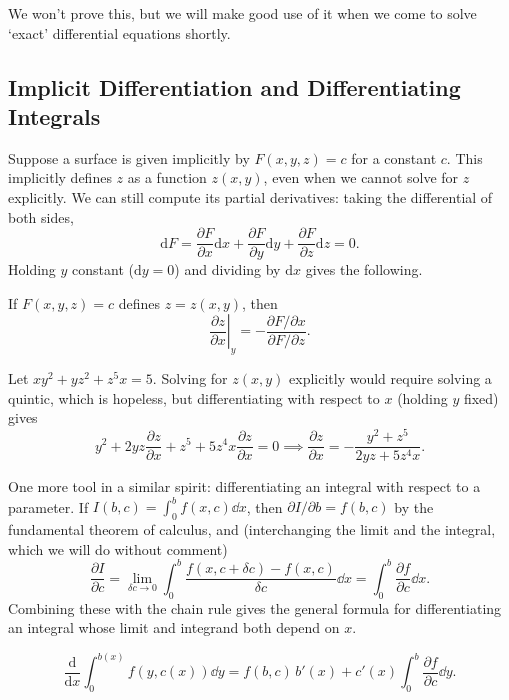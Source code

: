We won't prove this, but we will make good use of it when we come to solve `exact' differential equations shortly.

\subsection{Implicit Differentiation and Differentiating Integrals}

Suppose a surface is given implicitly by $F(x, y, z) = c$ for a constant $c$. This implicitly defines $z$ as a function $z(x, y)$, even when we cannot solve for $z$ explicitly. We can still compute its partial derivatives: taking the differential of both sides,
$$
\mathrm{d}F = \frac{\partial F}{\partial x} \mathrm{d}x + \frac{\partial F}{\partial y}\mathrm{d}y + \frac{\partial F}{\partial z}\mathrm{d}z = 0.
$$
Holding $y$ constant ($\mathrm{d}y = 0$) and dividing by $\mathrm{d}x$ gives the following.

\begin{proposition}
	If $F(x, y, z) = c$ defines $z = z(x, y)$, then
	$$
	\left.\frac{\partial z}{\partial x}\right|_y = -\frac{\partial F/\partial x}{\partial F/\partial z}.
	$$
\end{proposition}

\begin{example}
	Let $xy^2 + yz^2 + z^5 x = 5$. Solving for $z(x, y)$ explicitly would require solving a quintic, which is hopeless, but differentiating with respect to $x$ (holding $y$ fixed) gives
	$$
	y^2 + 2yz \frac{\partial z}{\partial x} + z^5 + 5z^4 x \frac{\partial z}{\partial x} = 0
	\implies \frac{\partial z}{\partial x} = -\frac{y^2 + z^5}{2yz + 5z^4 x}.
	$$
\end{example}

One more tool in a similar spirit: differentiating an integral with respect to a parameter. If $I(b, c) = \int_0^b f(x, c) \dd x$, then $\partial I/\partial b = f(b, c)$ by the fundamental theorem of calculus, and (interchanging the limit and the integral, which we will do without comment)
$$
\frac{\partial I}{\partial c} = \lim_{\delta c \to 0} \int_0^b \frac{f(x, c + \delta c) - f(x, c)}{\delta c} \dd x = \int_0^b \frac{\partial f}{\partial c} \dd x.
$$
Combining these with the chain rule gives the general formula for differentiating an integral whose limit and integrand both depend on $x$.

\begin{theorem}
	$$
	\frac{\mathrm{d}}{\mathrm{d}x} \int_0^{b(x)} f(y, c(x)) \dd y = f(b, c) \, b'(x) + c'(x)\int_0^{b} \frac{\partial f}{\partial c} \dd y.
	$$
\end{theorem}

